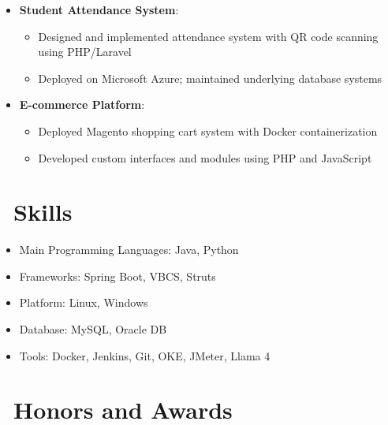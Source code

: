 \documentclass{resume}
\begin{document}

\begin{itemize}
  \item \textbf{Student Attendance System}:
    \begin{itemize}
      \item Designed and implemented attendance system with QR code scanning using PHP/Laravel
      \item Deployed on Microsoft Azure; maintained underlying database systems
    \end{itemize}
  \item \textbf{E-commerce Platform}:
    \begin{itemize}
      \item Deployed Magento shopping cart system with Docker containerization
      \item Developed custom interfaces and modules using PHP and JavaScript
    \end{itemize}
\end{itemize}

\section{\faCogs\ Skills}
\begin{itemize}[parsep=0.5ex]
  \item Main Programming Languages: Java, Python
  \item Frameworks: Spring Boot, VBCS, Struts
  \item Platform: Linux, Windows
  \item Database: MySQL, Oracle DB
  \item Tools: Docker, Jenkins, Git, OKE, JMeter, Llama 4
\end{itemize}

\section{\faHeartO\ Honors and Awards}

%
%
\end{document}
